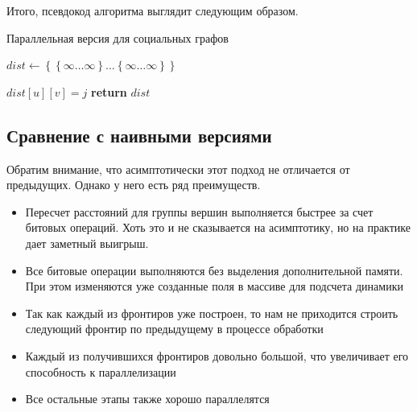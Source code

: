 Итого, псевдокод алгоритма выглядит следующим образом.

\FloatBarrier
\begin{algorithm}
\caption{Параллельная версия для социальных графов}\label{all_pairs_social}
\begin{algorithmic}[1]

\State $dist\gets \left\{ {   \left\{ {\infty \ldots \infty}\right\}  \ldots \left\{ {\infty \ldots \infty}\right\} }\right\}$
 

\State
\algrenewcommand{}
\algrenewcommand{}
		\algrenewcommand{}	
				\State $dist[u][v] = j$		
			\EndIf	
		\EndFor
		\algrenewcommand{}
	\EndFor
\EndFor 
\State \textbf{return} $dist$ 
\EndProcedure

\end{algorithmic}
\end{algorithm}


\FloatBarrier
\subsection{Сравнение с наивными версиями}

Обратим внимание, что асимптотически этот подход не отличается от предыдущих. Однако у него есть ряд преимуществ. 

\begin{itemize}
  \item Пересчет расстояний для группы вершин выполняется быстрее за счет битовых операций. Хоть это и не сказывается на асимптотику, но на практике дает заметный выигрыш. 
  \item Все битовые операции выполняются без выделения дополнительной памяти. При этом изменяются уже созданные поля в массиве для подсчета динамики
  \item Так как каждый из фронтиров уже построен, то нам не приходится строить следующий фронтир по предыдущему в процессе обработки
  \item Каждый из получившихся фронтиров довольно большой, что увеличивает его способность к параллелизации
  \item Все остальные этапы также хорошо параллелятся
\end{itemize}

